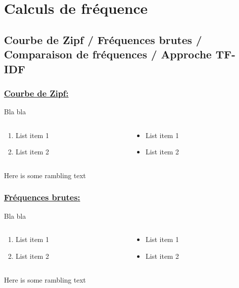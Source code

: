 \documentclass[xcolor=dvipsnames]{beamer}
\begin{document}
	\section*{Calculs de fréquence}
	\subsection*{Courbe de Zipf / Fréquences brutes / Comparaison de fréquences / Approche TF-IDF}

	\begin{frame}
		\frametitle{\underline{Courbe de Zipf:}}
		Bla bla 
		\begin{columns}
			\begin{column}{0.5\textwidth} %
				\begin{enumerate}
					\item List item 1
					\item List item 2
				\end{enumerate}
			\end{column}
			\begin{column}{0.5\textwidth}
				\begin{itemize}
					\item List item 1
					\item List item 2
				\end{itemize}
			\end{column}
		\end{columns}
		\vspace{\baselineskip}
		Here is some rambling text
	\end{frame}

	\begin{frame}
		\frametitle{\underline{Fréquences brutes:}}
		Bla bla 
		\begin{columns}
			\begin{column}{0.5\textwidth} %
				\begin{enumerate}
					\item List item 1
					\item List item 2
				\end{enumerate}
			\end{column}
			\begin{column}{0.5\textwidth}
				\begin{itemize}
					\item List item 1
					\item List item 2
				\end{itemize}
			\end{column}
		\end{columns}
		\vspace{\baselineskip}
		Here is some rambling text
	\end{frame}
\end{document}
